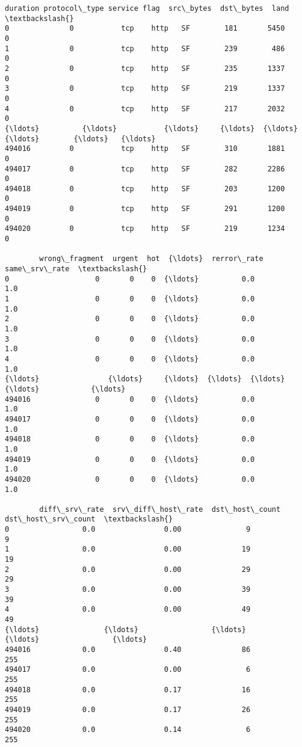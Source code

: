 \documentclass[11pt]{article}
\makeatletter
\newcommand{\boxspacing}{\kern\kvtcb@left@rule\kern\kvtcb@boxsep}
\newcommand{\prompt}[4]{
        {\ttfamily\llap{{\color{#2}[#3]:\hspace{3pt}#4}}\vspace{-\baselineskip}}
    }
\makeatother
\begin{document}
            \begin{tcolorbox}[breakable, size=fbox, boxrule=.5pt, pad at break*=1mm, opacityfill=0]
\prompt{Out}{outcolor}{ }{\boxspacing}
\begin{Verbatim}[commandchars=\\\{\}]
        duration protocol\_type service flag  src\_bytes  dst\_bytes  land  \textbackslash{}
0              0           tcp    http   SF        181       5450     0
1              0           tcp    http   SF        239        486     0
2              0           tcp    http   SF        235       1337     0
3              0           tcp    http   SF        219       1337     0
4              0           tcp    http   SF        217       2032     0
{\ldots}          {\ldots}           {\ldots}     {\ldots}  {\ldots}        {\ldots}        {\ldots}   {\ldots}
494016         0           tcp    http   SF        310       1881     0
494017         0           tcp    http   SF        282       2286     0
494018         0           tcp    http   SF        203       1200     0
494019         0           tcp    http   SF        291       1200     0
494020         0           tcp    http   SF        219       1234     0

        wrong\_fragment  urgent  hot  {\ldots}  rerror\_rate  same\_srv\_rate  \textbackslash{}
0                    0       0    0  {\ldots}          0.0            1.0
1                    0       0    0  {\ldots}          0.0            1.0
2                    0       0    0  {\ldots}          0.0            1.0
3                    0       0    0  {\ldots}          0.0            1.0
4                    0       0    0  {\ldots}          0.0            1.0
{\ldots}                {\ldots}     {\ldots}  {\ldots}  {\ldots}          {\ldots}            {\ldots}
494016               0       0    0  {\ldots}          0.0            1.0
494017               0       0    0  {\ldots}          0.0            1.0
494018               0       0    0  {\ldots}          0.0            1.0
494019               0       0    0  {\ldots}          0.0            1.0
494020               0       0    0  {\ldots}          0.0            1.0

        diff\_srv\_rate  srv\_diff\_host\_rate  dst\_host\_count  dst\_host\_srv\_count  \textbackslash{}
0                 0.0                0.00               9                   9
1                 0.0                0.00              19                  19
2                 0.0                0.00              29                  29
3                 0.0                0.00              39                  39
4                 0.0                0.00              49                  49
{\ldots}               {\ldots}                 {\ldots}             {\ldots}                 {\ldots}
494016            0.0                0.40              86                 255
494017            0.0                0.00               6                 255
494018            0.0                0.17              16                 255
494019            0.0                0.17              26                 255
494020            0.0                0.14               6                 255


\end{Verbatim}
\end{tcolorbox}
\end{document}
